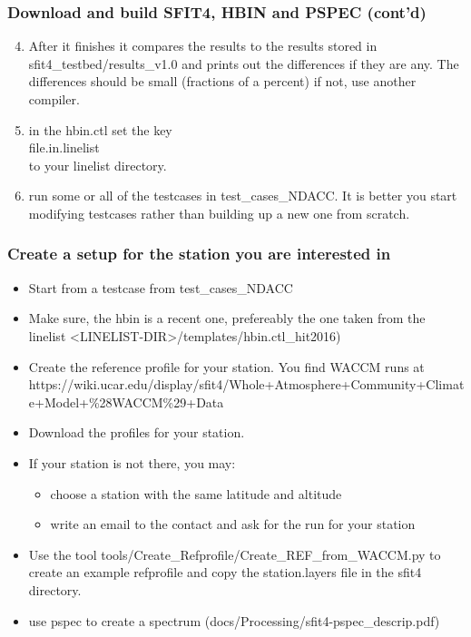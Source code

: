 \documentclass[notes=hide]{beamer}
\begin{document}
\begin{frame}
  \frametitle{Download and build SFIT4, HBIN and PSPEC (cont'd)}
  \begin{enumerate}
    \setcounter{enumi}{3}
  \item After it finishes it compares the results to the results
    stored in sfit4\_testbed/results\_v1.0 and prints out the differences
    if they are any. The differences should be small (fractions of a
    percent) if not, use another compiler.
  \item in the hbin.ctl set the key\\
    file.in.linelist\\
    to your linelist directory.
  \item run some or all of the testcases in test\_cases\_NDACC. It is
    better you start modifying testcases rather than building up a new
    one from scratch.
  \end{enumerate}
\end{frame}

\begin{frame}
  \frametitle{Create a setup for the station you are interested in}
  \begin{itemize}
  \item Start from a testcase from test\_cases\_NDACC
  \item Make sure, the hbin is a recent one, prefereably the one taken from the
    linelist <LINELIST-DIR>/templates/hbin.ctl_hit2016)
  \item Create the reference profile for your station. You find WACCM runs at
    https://wiki.ucar.edu/display/sfit4/Whole+Atmosphere+Community+Climate+Model+\%28WACCM\%29+Data
  \item Download the profiles for your station.
  \item If your station is not there, you may:
    \begin{itemize}
    \item choose a station with the same latitude and altitude
    \item write an email to the contact and ask for the run for your station
    \end{itemize}
  \item Use the tool tools/Create\_Refprofile/Create\_REF\_from\_WACCM.py to create an example
    refprofile and copy the station.layers file in the sfit4 directory.
  \item use pspec to create a spectrum (docs/Processing/sfit4-pspec\_descrip.pdf) 
  \end{itemize}
\end{frame}
  
\end{document}
